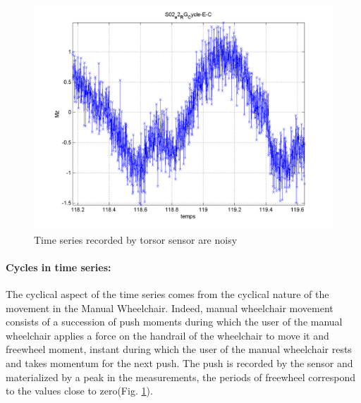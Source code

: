 \begin{figure}[h]
\center
\includegraphics[scale = 0.5]{images/TSN}
\caption{Time series recorded by torsor sensor are noisy}
\label{TWMWC}
\end{figure}

\paragraph{Cycles in time series:} The cyclical aspect of the time series comes from the cyclical nature of the movement in the Manual Wheelchair. Indeed, manual wheelchair movement consists of a succession of push moments during which the user of the manual wheelchair applies a force on the handrail of the wheelchair to move it and freewheel moment, instant during which the user of the manual wheelchair rests and takes momentum for the next push. The push is recorded by the sensor and materialized by a peak in the measurements, the periods of freewheel correspond to the values close to zero(Fig. \ref{TWMWC}). 

